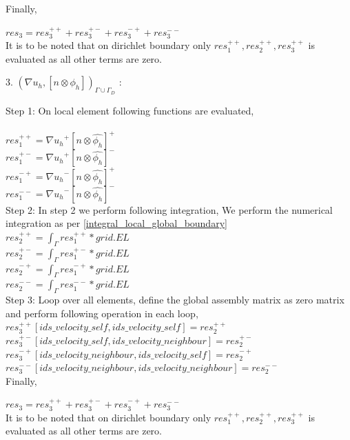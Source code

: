 \documentclass[a4paper,12pt]{book}
\begin{document}
Finally,

$res_3 = res_3^{++} + res_3^{+-} + res_3^{-+} + res_3^{--}$\\

It is to be noted that on dirichlet boundary only $res_1^{++}, res_2^{++}, res_3^{++}$ is evaluated as all other terms are zero.

3. $({\nabla u_h}, [n \otimes \phi_h])_{\Gamma \cup \Gamma_D}$ :

Step 1: On local element following functions are evaluated,\\
\\
$res_1^{++} = {\nabla u_h}^+ [n \otimes \hat{\phi_h}]^+$\\
$res_1^{+-} = {\nabla u_h}^+ [n \otimes \hat{\phi_h}]^-$\\
$res_1^{-+} = {\nabla u_h}^- [n \otimes \hat{\phi_h}]^+$\\
$res_1^{--} = {\nabla u_h}^- [n \otimes \hat{\phi_h}]^-$\\

Step 2: In step 2 we perform following integration, 
We perform the numerical integration as per \ref{integral_local_global_boundary}
\\ 
$res_2^{++} = \int_{\Gamma} res_1^{++} * grid.EL$\\
$res_2^{+-} = \int_{\Gamma} res_1^{+-} * grid.EL$\\
$res_2^{-+} = \int_{\Gamma} res_1^{-+} * grid.EL$\\
$res_2^{--} = \int_{\Gamma} res_1^{--} * grid.EL$\\

Step 3: Loop over all elements, define the global assembly matrix as zero matrix and perform following operation in each loop,
\\
$res_3^{++}[ids\_velocity\_self,ids\_velocity\_self] = res_2^{++}$\\
$res_3^{+-}[ids\_velocity\_self,ids\_velocity\_neighbour] = res_2^{+-}$\\
$res_3^{-+}[ids\_velocity\_neighbour,ids\_velocity\_self] = res_2^{-+}$\\
$res_3^{--}[ids\_velocity\_neighbour,ids\_velocity\_neighbour] = res_2^{--}$\\

Finally,

$res_3 = res_3^{++} + res_3^{+-} + res_3^{-+} + res_3^{--}$\\

It is to be noted that on dirichlet boundary only $res_1^{++}, res_2^{++}, res_3^{++}$ is evaluated as all other terms are zero.
\end{document}

